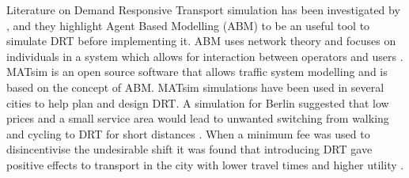 \documentclass[a4paper]{article}
\begin{document}


Literature on Demand Responsive Transport simulation has been investigated by \citealp{ronald2015simulating}, and they highlight Agent Based Modelling (ABM) to be an useful tool to simulate DRT before implementing it. ABM uses network theory and focuses on individuals in a system which allows for interaction between operators and users \citep{ronald2015simulating}. MATsim is an open source software that allows traffic system modelling and is based on the concept of ABM.
MATsim simulations have been used in several cities to help plan and design DRT. A simulation for Berlin suggested that low prices and a small service area would lead to unwanted switching from walking and cycling to DRT for short distances \citep{kaddoura2020impact}. When a minimum fee was used to disincentivise the undesirable shift it was found that introducing DRT gave positive effects to transport in the city with lower travel times and higher utility \citep{kaddoura2020impact}.\\
\end{document}
